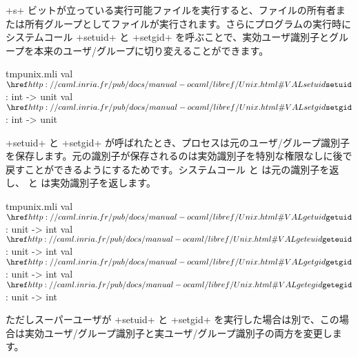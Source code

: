 \ml+s+ ビットが立っている実行可能ファイルを実行すると、ファイルの所有者または所有グループとしてファイルが実行されます。さらにプログラムの実行時にシステムコール \ml+setuid+ と \ml+setgid+ を呼ぶことで、実効ユーザ識別子とグループを本来のユーザ/グループに切り変えることができます。
%
\begin{listingcodefile}{tmpunix.mli}
val $\libvalue{Unix}{setuid}$ : int -> unit
val $\libvalue{Unix}{setgid}$ : int -> unit
\end{listingcodefile}
%
\ml+setuid+ と \ml+setgid+ が呼ばれたとき、プロセスは元のユーザ/グループ識別子を保存します。元の識別子が保存されるのは実効識別子を特別な権限なしに後で戻すことができるようにするためです。システムコール  と  は元の識別子を返し、 と  は実効識別子を返します。
%
\begin{listingcodefile}{tmpunix.mli}
val $\libvalue{Unix}{getuid}$ : unit -> int
val $\libvalue{Unix}{geteuid}$ : unit -> int
val $\libvalue{Unix}{getgid}$ : unit -> int
val $\libvalue{Unix}{getegid}$ : unit -> int
\end{listingcodefile}
ただしスーパーユーザが \ml+setuid+ と \ml+setgid+  を実行した場合は別で、この場合は実効ユーザ/グループ識別子と実ユーザ/グループ識別子の両方を変更します。

